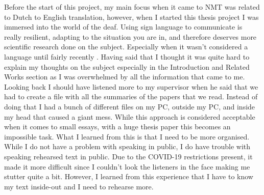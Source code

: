 Before the start of this project, my main focus when it came to NMT was related to Dutch to English translation, however, when I started this thesis project I was immersed into the world of the deaf. Using sign language to communicate is really resilient, adapting to the situation you are in, and therefore deserves more scientific research done on the subject. Especially when it wasn't considered a language until fairly recently \cite{stokoe2005sign}. Having said that I thought it was quite hard to explain my thoughts on the subject especially in the Introduction and Related Works section as I was overwhelmed by all the information that came to me. Looking back I should have listened more to my supervisor when he said that we had to create a file with all the summaries of the papers that we read. Instead of doing that I had a bunch of different files on my PC, outside my PC, and inside my head that caused a giant mess. While this approach is considered acceptable when it comes to small essays, with a huge thesis paper this becomes an impossible task. What I learned from this is that I need to be more organised.
While I do not have a problem with speaking in public, I do have trouble with speaking rehearsed text in public. Due to the COVID-19 restrictions present, it made it more difficult since I couldn't look the listeners in the face making me stutter quite a bit. However, I learned from this experience that I have to know my text inside-out and I need to rehearse more.


